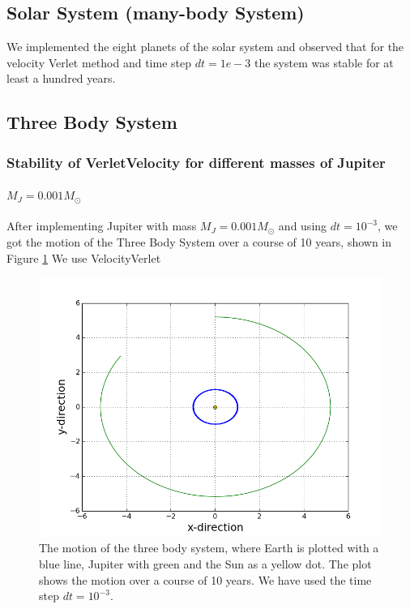 \documentclass[norsk,a4paper,12pt]{article}
\begin{document}
{\subsection{Solar System (many-body System)}
We implemented the eight planets of the solar system and observed that for the velocity Verlet method and time step $dt=1e-3$ the system was stable for at least a hundred years. 

\subsection{Three Body System}

\subsubsection{Stability of VerletVelocity for different masses of Jupiter}

\paragraph{\textbf{$M_J = 0.001M_{\odot}$}}

After implementing Jupiter with mass $M_J = 0.001M_{\odot}$ and using $dt = 10^{-3}$, we got the motion of the Three Body System over a course of 10 years, shown in Figure \ref{fig:Jupiter_m=10^(-3)_Earth_dt=10^(-3)} We use VelocityVerlet

\begin{figure} [H]
    \centering
    \includegraphics[scale=0.6]{oppg_3e_threebody_Jupiter_m=10_(-3)_Earth}
    \caption{The motion of the three body system, where Earth is plotted with a blue line, Jupiter with green and the Sun as a yellow dot. The plot shows the motion over a course of 10 years. We have used the time step $dt = 10^{-3}$.}
    \label{fig:Jupiter_m=10^(-3)_Earth_dt=10^(-3)}
\end{figure}

}
\end{document}
